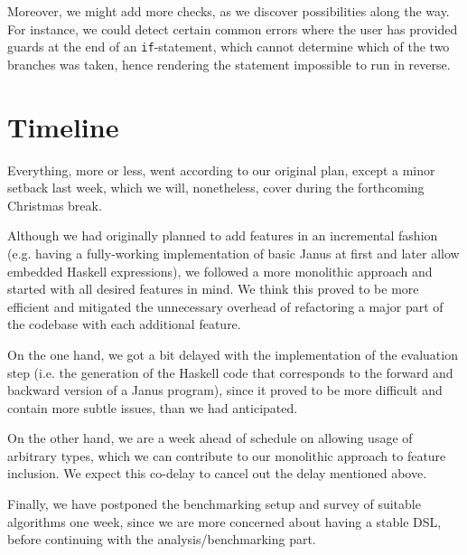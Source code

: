 \documentclass[12pt,a4paper]{article}
\newcommand{\code}[1]{\texttt{#1}}
\begin{document}
Moreover, we might add more checks, as we discover possibilities along the way. For instance, we could detect certain common errors where the user has provided guards at the end of an \code{if}-statement, which cannot determine which of the two branches was taken, hence rendering the statement impossible to run in reverse.

\section{Timeline}
Everything, more or less, went according to our original plan, except a minor setback last week, which we will, nonetheless, cover during the forthcoming Christmas break.

Although we had originally planned to add features in an incremental fashion (e.g. having a fully-working implementation of basic Janus at first and later allow embedded Haskell expressions), we followed a more monolithic approach and started with all desired features in mind. We think this proved to be more efficient and mitigated the unnecessary overhead of refactoring a major part of the codebase with each additional feature.

On the one hand, we got a bit delayed with the implementation of the evaluation step (i.e. the generation of the Haskell code that corresponds to the forward and backward version of a Janus program), since it proved to be more difficult and contain more subtle issues, than we had anticipated.

On the other hand, we are a week ahead of schedule on allowing usage of arbitrary types, which we can contribute to our monolithic approach to feature inclusion. We expect this co-delay to cancel out the delay mentioned above.

Finally, we have postponed the benchmarking setup and survey of suitable algorithms one week, since we are more concerned about having a stable DSL, before continuing with the analysis/benchmarking part.

\newpage



\end{document}
